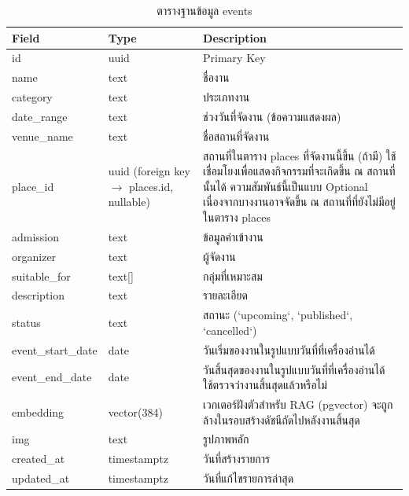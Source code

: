 \begin{table}[H]
\centering
\caption{ตารางฐานข้อมูล events}
\label{tab:db_event}
\begin{tabular}{|p{3.6cm}|p{2.6cm}|p{6.8cm}|}
\hline
\textbf{Field} & \textbf{Type} & \textbf{Description} \\
\hline
id & uuid & Primary Key \\ \hline
name & text & ชื่องาน \\ \hline
category & text & ประเภทงาน \\ \hline
date\_range & text & ช่วงวันที่จัดงาน (ข้อความแสดงผล) \\ \hline
venue\_name & text & ชื่อสถานที่จัดงาน \\ \hline
place\_id & uuid (foreign key $\to$ places.id, nullable) & สถานที่ในตาราง places ที่จัดงานนี้ขึ้น (ถ้ามี) ใช้เชื่อมโยงเพื่อแสดงกิจกรรมที่จะเกิดขึ้น ณ สถานที่นั้นได้ ความสัมพันธ์นี้เป็นแบบ Optional เนื่องจากบางงานอาจจัดขึ้น ณ สถานที่ที่ยังไม่มีอยู่ในตาราง places \\ \hline
admission & text & ข้อมูลค่าเข้างาน \\ \hline
organizer & text & ผู้จัดงาน \\ \hline
suitable\_for & text[] & กลุ่มที่เหมาะสม \\ \hline
description & text & รายละเอียด \\ \hline
status & text & สถานะ (`upcoming`, `published`, `cancelled`) \\ \hline
event\_start\_date & date & วันเริ่มของงานในรูปแบบวันที่ที่เครื่องอ่านได้ \\ \hline
event\_end\_date & date & วันสิ้นสุดของงานในรูปแบบวันที่ที่เครื่องอ่านได้ ใช้ตรวจว่างานสิ้นสุดแล้วหรือไม่ \\ \hline
embedding & vector(384) & เวกเตอร์ฝังตัวสำหรับ RAG (pgvector) จะถูกล้างในรอบสร้างดัชนีถัดไปหลังงานสิ้นสุด \\ \hline
img & text & รูปภาพหลัก \\ \hline
created\_at & timestamptz & วันที่สร้างรายการ \\ \hline
updated\_at & timestamptz & วันที่แก้ไขรายการล่าสุด \\
\hline
\end{tabular}
\end{table}

